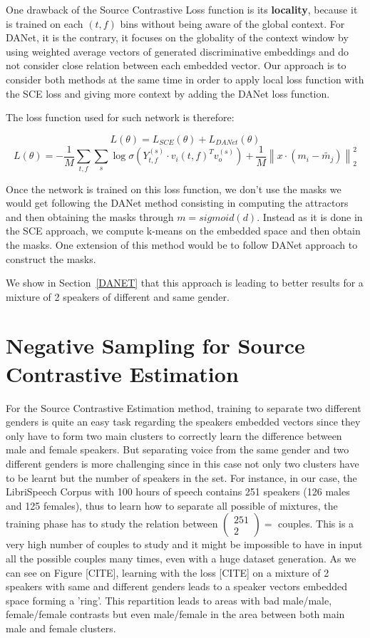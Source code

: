 \documentclass[master, tikz, final,11pt, dvipdfmx]{iscs-thesis}
\newcommand{\norm}[1]{\left\lVert#1\right\rVert}
\begin{document}
One drawback of the Source Contrastive Loss function is its \textbf{locality}, because it is trained on each $(t,f)$ bins without being aware of the global context. For DANet, it is the contrary, it focuses on the globality of the context window by using weighted average vectors of generated discriminative embeddings and do not consider close relation between each embedded vector.
Our approach is to consider both methods at the same time in order to apply local loss function with the SCE loss and giving more context by adding the DANet loss function.

The loss function used for such network is therefore:

\[L(\theta) = L_{SCE}(\theta) + L_{DANet}(\theta)\]
\[L(\theta) = - \frac{1}{M} \sum_{t,f} \sum_{s} \log \sigma(Y_{t,f}^{(s)} \cdot v_i(t,f)^{T} v_o^{(s)}) + \frac{1}{M} \norm{x \cdot (m_i - \tilde{m_j})}^2_2\]

Once the network is trained on this loss function, we don't use the masks we would get following the DANet method consisting in computing the attractors and then obtaining the masks through $m = sigmoid(d)$. Instead as it is done in the SCE approach, we compute k-means on the embedded space and then obtain the masks. One extension of this method would be to follow DANet approach to construct the masks.

We show in Section~\ref{DANET} that this approach is leading to better results for a mixture of 2 speakers of different and same gender.


\section{Negative Sampling for Source Contrastive Estimation}

For the Source Contrastive Estimation method, training to separate two different genders is quite an easy task regarding the speakers embedded vectors since they only have to form two main clusters to correctly learn the difference between male and female speakers. But separating voice from the same gender and two different genders is more challenging since in this case not only two clusters have to be learnt but the number of speakers in the set. For instance, in our case, the LibriSpeech Corpus with 100 hours of speech contains 251 speakers (126 males and 125 females), thus to learn how to separate all possible of mixtures, the training phase has to study the relation between $\left(\! \begin{array}{c} 251 \\ 2 \end{array} \!\right) = $ couples. This is a very high number of couples to study and it might be impossible to have in input all the possible couples many times, even with a huge dataset generation. As we can see on Figure [CITE], learning with the loss [CITE] on a mixture of 2 speakers with same and different genders leads to a speaker vectors embedded space forming a 'ring'. This repartition leads to areas with bad male/male, female/female contrasts but even male/female in the area between both main male and female clusters. 
\end{document}
